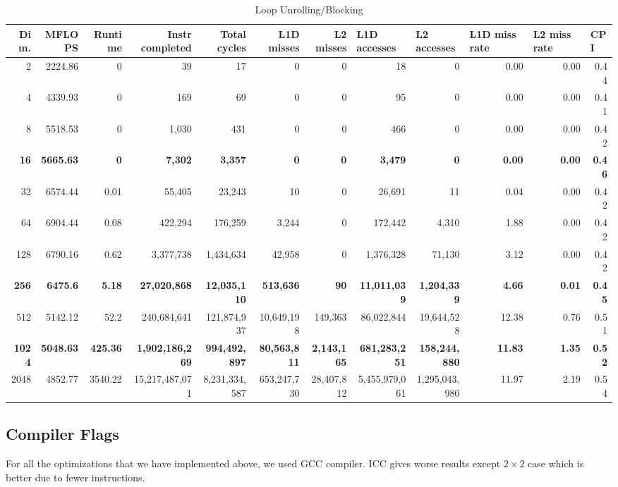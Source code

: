 \documentclass{article}
\begin{document}
\begin{table}[htbp]
\tiny
\caption{Loop Unrolling/Blocking}
\begin{tabular}{|r|r|r|r|r|r|r|r|r|r|r|r|}
\hline
Dim. &   MFLOPS &     Runtime & Instr completed & Total cycles & L1D misses & L2 misses & \multicolumn{1}{l|}{L1D accesses} & \multicolumn{1}{l|}{ L2 accesses} & \multicolumn{1}{l|}{L1D miss rate} & \multicolumn{1}{l|}{L2 miss rate} & \multicolumn{1}{l|}{CPI} \\ \hline
2 & 2224.86 & 0 & 39 & 17 & 0 & 0 & 18 & 0 & 0.00 & 0.00 & 0.44 \\ \hline
4 & 4339.93 & 0 & 169 & 69 & 0 & 0 & 95 & 0 & 0.00 & 0.00 & 0.41 \\ \hline
8 & 5518.53 & 0 & 1,030 & 431 & 0 & 0 & 466 & 0 & 0.00 & 0.00 & 0.42 \\ \hline
\textbf{16} & \textbf{5665.63} & \textbf{0} & \textbf{7,302} & \textbf{3,357} & \textbf{0} & \textbf{0} & \textbf{3,479} & \textbf{0} & \textbf{0.00} & \textbf{0.00} & \textbf{0.46} \\ \hline
32 & 6574.44 & 0.01 & 55,405 & 23,243 & 10 & 0 & 26,691 & 11 & 0.04 & 0.00 & 0.42 \\ \hline
64 & 6904.44 & 0.08 & 422,294 & 176,259 & 3,244 & 0 & 172,442 & 4,310 & 1.88 & 0.00 & 0.42 \\ \hline
128 & 6790.16 & 0.62 & 3,377,738 & 1,434,634 & 42,958 & 0 & 1,376,328 & 71,130 & 3.12 & 0.00 & 0.42 \\ \hline
\textbf{256} & \textbf{6475.6} & \textbf{5.18} & \textbf{27,020,868} & \textbf{12,035,110} & \textbf{513,636} & \textbf{90} & \textbf{11,011,039} & \textbf{1,204,339} & \textbf{4.66} & \textbf{0.01} & \textbf{0.45} \\ \hline
512 & 5142.12 & 52.2 & 240,684,641 & 121,874,937 & 10,649,198 & 149,363 & 86,022,844 & 19,644,528 & 12.38 & 0.76 & 0.51 \\ \hline
\textbf{1024} & \textbf{5048.63} & \textbf{425.36} & \textbf{1,902,186,269} & \textbf{994,492,897} & \textbf{80,563,811} & \textbf{2,143,165} & \textbf{681,283,251} & \textbf{158,244,880} & \textbf{11.83} & \textbf{1.35} & \textbf{0.52} \\ \hline
2048 & 4852.77 & 3540.22 & 15,217,487,071 & 8,231,334,587 & 653,247,730 & 28,407,812 & 5,455,979,061 & 1,295,043,980 & 11.97 & 2.19 & 0.54 \\ \hline
\end{tabular}
\label{}
\end{table}

\subsection{Compiler Flags}
For all the optimizations that we have implemented above, we used GCC compiler.  ICC gives worse results except $2 \times 2$ case which is better due to fewer instructions.
\end{document}
